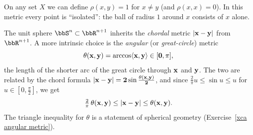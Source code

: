 \begin{example}
    On any set $X$ we can define $\rho(x,y)=1$ for $x\neq y$ (and $\rho(x,x)=0$). In this metric every point is ``isolated'': the ball of radius $1$ around $x$ consists of $x$ alone.
\end{example}

\begin{example}\label{example sphere metrics}
    The unit sphere $\bbS^n\subset\bbR^{n+1}$ inherits the \emph{chordal} metric $\lvert \bf{x}-\bf{y}\rvert$ from $\bbR^{n+1}$. A more intrinsic choice is the \emph{angular} (or \emph{great-circle}) metric
    \[\theta(\bf{x},\bf{y})=\arccos\langle \bf{x},\bf{y}\rangle\in[0,\pi],\]
    the length of the shorter arc of the great circle through $\bf{x}$ and $\bf{y}$. The two are related by the chord formula $\lvert \bf{x}-\bf{y}\rvert=2\sin\frac{\theta(\bf{x},\bf{y})}{2}$, and since $\frac{2}{\pi}u\leq\sin u\leq u$ for $u\in[0,\frac\pi2]$, we get
    \[\tfrac{2}{\pi}\,\theta(\bf{x},\bf{y})\leq \lvert \bf{x}-\bf{y}\rvert\leq \theta(\bf{x},\bf{y}).\]
    The triangle inequality for $\theta$ is a statement of spherical geometry (Exercise~\ref{xca angular metric}).
\end{example}

